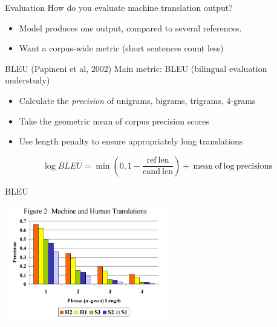\documentclass{beamer}
\begin{document}
\begin{frame}{Evaluation}
  How do you evaluate machine translation output?
  
  \begin{itemize}
  \item Model produces one output, compared to several references.
    \air
  \item Want a corpus-wide metric (short sentences count less)
  \end{itemize}

\end{frame}

\begin{frame}{BLEU (Papineni et al, 2002)}
    Main metric: BLEU (bilingual evaluation understudy)

  \begin{itemize}
  \item Calculate the \textit{precision} of unigrams, bigrams, trigrams, 4-grams
    \air 
  \item Take the geometric mean of corpus precision scores
    \air 
  \item Use length penalty to ensure appropriately long translations 
  \end{itemize}

  \[ \log BLEU = \min(0, 1 - \frac{\mathrm{ref\ len}}{\mathrm{cand\ len}}) + \mathrm{\ mean \ of \ log \ precisions} \] 

\end{frame}


\begin{frame}{BLEU}
  \begin{center}
    \includegraphics[width=7cm]{bleulen}
  \end{center}
\end{frame}

  
\end{document}

